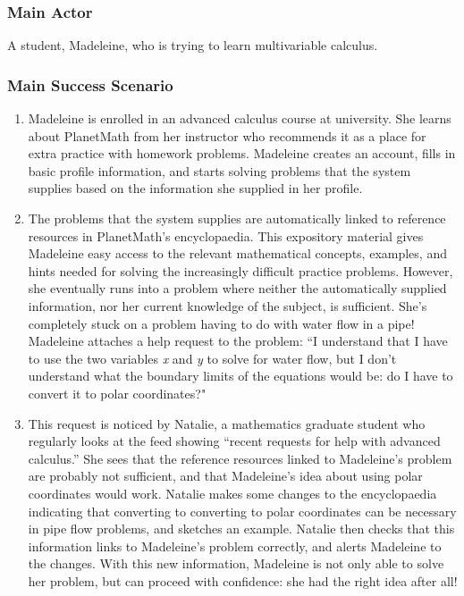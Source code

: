\subsubsection{Main Actor}

A student, Madeleine, who is trying to learn multivariable calculus.

\subsubsection{Main Success Scenario}

\begin{enumerate}
\item
  Madeleine is enrolled in an advanced calculus course at university.
  She learns about PlanetMath from her instructor who recommends it as a
  place for extra practice with homework problems. Madeleine creates an
  account, fills in basic profile information, and starts solving
  problems that the system supplies based on the information she
  supplied in her profile.
\item
  The problems that the system supplies are automatically linked to
  reference resources in PlanetMath's encyclopaedia. This expository
  material gives Madeleine easy access to the relevant mathematical
  concepts, examples, and hints needed for solving the increasingly
  difficult practice problems. However, she eventually runs into a
  problem where neither the automatically supplied information, nor her
  current knowledge of the subject, is sufficient. She's completely
  stuck on a problem having to do with water flow in a pipe! Madeleine
  attaches a help request to the problem: ``I understand that I have to
  use the two variables \emph{x} and \emph{y} to solve for water flow,
  but I don't understand what the boundary limits of the equations would
  be: do I have to convert it to polar coordinates?"
\item
  This request is noticed by Natalie, a mathematics graduate student who
  regularly looks at the feed showing ``recent requests for help with
  advanced calculus.'' She sees that the reference resources linked to
  Madeleine's problem are probably not sufficient, and that Madeleine's
  idea about using polar coordinates would work. Natalie makes some
  changes to the encyclopaedia indicating that converting to converting
  to polar coordinates can be necessary in pipe flow problems, and
  sketches an example. Natalie then checks that this information links
  to Madeleine's problem correctly, and alerts Madeleine to the changes.
  With this new information, Madeleine is not only able to solve her
  problem, but can proceed with confidence: she had the right idea after
  all!
\end{enumerate}
